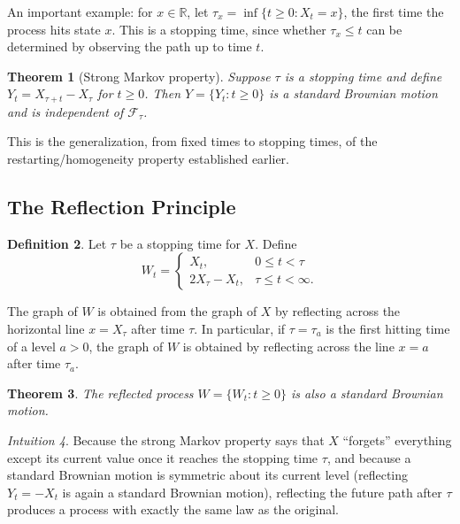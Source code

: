 \documentclass[12pt,openany]{book}
\newtheorem{theorem}{Theorem}[section]
\theoremstyle{definition}
\newtheorem{definition}[theorem]{Definition}
\theoremstyle{remark}
\newtheorem{intuition}[theorem]{Intuition}
\newcommand{\R}{\mathbb{R}}
\newcommand{\Fscr}{\mathcal{F}}
\begin{document}
An important example: for $x \in \R$, let $\tau_x = \inf\{t \ge 0 : X_t = x\}$, the first time the process hits state $x$. This is a stopping time, since whether $\tau_x \le t$ can be determined by observing the path up to time $t$.
 
\begin{theorem}[Strong Markov property]
Suppose $\tau$ is a stopping time and define $Y_t = X_{\tau+t} - X_\tau$ for $t \ge 0$. Then $Y = \{Y_t : t \ge 0\}$ is a standard Brownian motion and is independent of $\Fscr_\tau$.
\end{theorem}
 
This is the generalization, from fixed times to stopping times, of the restarting/homogeneity property established earlier.
 
\subsection{The Reflection Principle}
 
\begin{definition}
Let $\tau$ be a stopping time for $X$. Define
\begin{equation}
    W_t = \begin{cases} X_t, & 0 \le t < \tau \\ 2X_\tau - X_t, & \tau \le t < \infty. \end{cases} \tag{18.1.16}
\end{equation}
\end{definition}
The graph of $W$ is obtained from the graph of $X$ by reflecting across the horizontal line $x = X_\tau$ after time $\tau$. In particular, if $\tau = \tau_a$ is the first hitting time of a level $a>0$, the graph of $W$ is obtained by reflecting across the line $x=a$ after time $\tau_a$.
 
\begin{theorem}
The reflected process $W = \{W_t : t \ge 0\}$ is also a standard Brownian motion.
\end{theorem}
 
\begin{intuition}
Because the strong Markov property says that $X$ ``forgets'' everything except its current value once it reaches the stopping time $\tau$, and because a standard Brownian motion is symmetric about its current level (reflecting $Y_t = -X_t$ is again a standard Brownian motion), reflecting the future path after $\tau$ produces a process with exactly the same law as the original.
\end{intuition}
 
\end{document}
